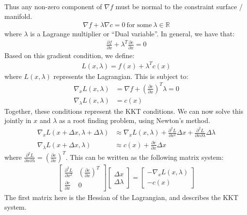 \noindent
Thus any non-zero component of $\nabla f$ must be normal to the constraint surface / manifold. 
\begin{align}
    \nabla f + \lambda \nabla c = 0 \ \textrm{for some} \ \lambda \in \mathbb{R}
\end{align}
where $\lambda$ is a Lagrange multiplier or ``Dual variable''. In general, we have that:
\begin{align}
    \frac{\partial f}{\partial x} + \lambda^T \frac{\partial c}{\partial x} = 0
\end{align}
Based on this gradient condition, we define: 
\begin{align}
    L(x,\lambda) = f(x) + \lambda^T c(x)
\end{align}
where $L(x, \lambda)$ represents the Lagrangian. This is subject to: 
\begin{align}
    \nabla_x L(x,\lambda) &= \nabla f + (\frac{\partial c}{\partial x})^T \lambda = 0 \\
    \nabla_{\lambda} L(x,\lambda) &= c(x)
\end{align}
Together, these conditions represent the KKT conditions. We can now solve this jointly in $x$ and $\lambda$ as a root finding problem, using Newton's method. 
\begin{align}
    \nabla_x L (x + \Delta x, \lambda + \Delta \lambda) &\approx \nabla_x L (x, \lambda) + \frac{\partial^2 L}{\partial x^2} \Delta x + \frac{\partial^2 L}{\partial x \partial \lambda} \Delta \lambda  \\
    \nabla_{\lambda} L (x + \Delta x, \lambda) &\approx c(x) + \frac{\partial c}{\partial x} \Delta x
\end{align}
where $\frac{\partial^2 L}{\partial x \partial \lambda} = (\frac{\partial c}{\partial x})^T$. 
This can be written as the following matrix system:
\begin{align}
    \begin{bmatrix}
        \frac{\partial^2 L}{\partial x^2}  &  (\frac{\partial c}{\partial x})^T \\
        \frac{\partial c}{\partial x} & 0 
    \end{bmatrix}
    \begin{bmatrix}
        \Delta x \\
        \Delta \lambda
    \end{bmatrix}
    = 
    \begin{bmatrix}
        -\nabla_x L(x,\lambda) \\
        - c(x)
    \end{bmatrix}
\end{align}
The first matrix here is the Hessian of the Lagrangian, and describes the KKT system. 

